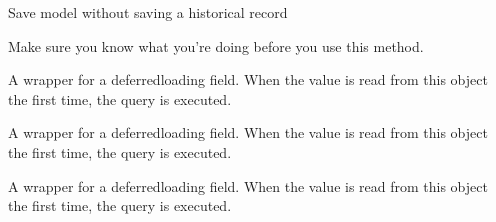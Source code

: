 \documentclass[letterpaper,10pt,english]{sphinxmanual}
\begin{document}
\begin{fulllineitems}

\begin{fulllineitems}
\label{\detokenize{pages_app.models:pages_app.models.MenuItem.save_without_historical_record}}
\pysigstartsignatures
\pysiglinewithargsret
{}
{\sphinxparamcomma {}}
{}
\pysigstopsignatures
\sphinxAtStartPar
Save model without saving a historical record

\sphinxAtStartPar
Make sure you know what you’re doing before you use this method.

\end{fulllineitems}


\begin{fulllineitems}
\label{\detokenize{pages_app.models:id31}}
\pysigstartsignatures
\pysigline
{}
\pysigstopsignatures
\sphinxAtStartPar
A wrapper for a deferred\sphinxhyphen{}loading field. When the value is read from this
object the first time, the query is executed.

\end{fulllineitems}


\begin{fulllineitems}
\label{\detokenize{pages_app.models:id32}}
\pysigstartsignatures
\pysigline
{}
\pysigstopsignatures
\sphinxAtStartPar
A wrapper for a deferred\sphinxhyphen{}loading field. When the value is read from this
object the first time, the query is executed.

\end{fulllineitems}


\begin{fulllineitems}
\label{\detokenize{pages_app.models:pages_app.models.MenuItem.updated_at}}
\pysigstartsignatures
\pysigline
{}
\pysigstopsignatures
\sphinxAtStartPar
A wrapper for a deferred\sphinxhyphen{}loading field. When the value is read from this
object the first time, the query is executed.

\end{fulllineitems}


\end{fulllineitems}
\end{document}

